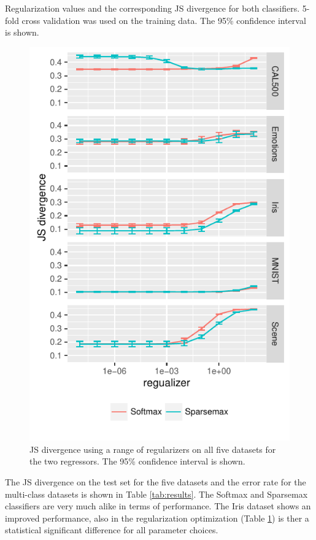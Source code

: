 \begin{table}[H]
\centering

\caption{Regularization values and the corresponding JS divergence for both classifiers. 5-fold cross validation was used on the training data. The 95\% confidence interval is shown.}
\label{tab:hyperparameters}
\end{table}
\begin{figure}[H]
	\centering
	\includegraphics[scale=1]{figures/hyperparameter.pdf}
\caption{JS divergence using a range of regularizers on all five datasets for the two regressors. The 95\% confidence interval is shown.}
\label{fig:hyperparameters}
\end{figure}

The JS divergence on the test set for the five datasets and the error rate for the multi-class datasets is shown in Table \ref{tab:results}. The Softmax and Sparsemax classifiers are very much alike in terms of performance. The Iris dataset shows an improved performance, also in the regularization optimization (Table \ref{fig:hyperparameters}) is ther a statistical significant difference for all parameter choices.

